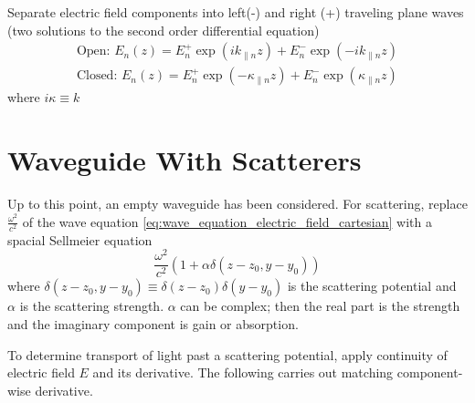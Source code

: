

Separate electric field components into left(-) and right (+) traveling plane waves (two solutions to the second order differential equation)
\begin{equation}
\begin{gathered}
\text{Open: \ }  E_n(z) = E_n^+ \exp(i k_{\parallel n} z) + E_n^- \exp(-i k_{\parallel n} z) \\
\text{Closed: \ }   E_n(z) = E_n^+ \exp(-\kappa_{\parallel n} z) + E_n^- \exp(\kappa_{\parallel n} z) 
\end{gathered}
\label{eq:Eleftandrightpropagating}
\end{equation}
where $i \kappa \equiv k$

\section{Waveguide With Scatterers}
Up to this point, an empty waveguide has been considered. For scattering, replace $\frac{\omega^2}{c^2}$ of the wave equation \ref{eq:wave_equation_electric_field_cartesian} with a spacial Sellmeier equation
\begin{equation}
\frac{\omega^2}{c^2} (1 + \alpha \delta(z-z_0,y-y_0))
\label{eq:scatterer}
\end{equation}
where $\delta(z-z_0,y-y_0) \equiv \delta(z-z_0) \delta(y-y_0)$ is the scattering potential and $\alpha$ is the scattering strength. $\alpha$ can be complex; then the real part is the strength and the imaginary component is gain or absorption.


To determine transport of light past a scattering potential, apply continuity of electric field $E$ and its derivative. The following carries out matching component-wise derivative.


